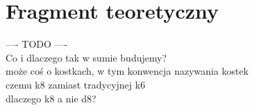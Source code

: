 \chapter{Fragment teoretyczny}

---- TODO ---- \\

Co i dlaczego tak w sumie budujemy? \\
może coś o kostkach, w tym konwencja nazywania kostek  \\
czemu k8 zamiast tradycyjnej k6 \\
dlaczego k8 a nie d8?  \\

